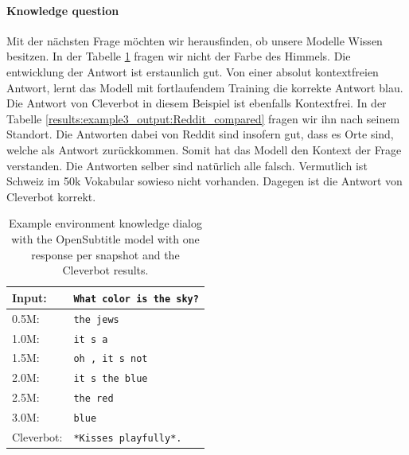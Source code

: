 \paragraph{Knowledge question}Mit der nächsten Frage möchten wir herausfinden, ob unsere Modelle Wissen besitzen. In der Tabelle \ref{results:example3_output:OpenSubtitle_compared} fragen wir nicht der Farbe des Himmels. Die entwicklung der Antwort ist erstaunlich gut. Von einer absolut kontextfreien Antwort, lernt das Modell mit fortlaufendem Training die korrekte Antwort blau. Die Antwort von Cleverbot in diesem Beispiel ist ebenfalls Kontextfrei.
In der Tabelle \ref{results:example3_output:Reddit_compared} fragen wir ihn nach seinem Standort. Die Antworten dabei von Reddit sind insofern gut, dass es Orte sind, welche als Antwort zurückkommen. Somit hat das Modell den Kontext der Frage verstanden. Die Antworten selber sind natürlich alle falsch. Vermutlich ist Schweiz im 50k Vokabular sowieso nicht vorhanden. Dagegen ist die Antwort von Cleverbot korrekt.
\begin{table}[H]
	\centering
	\begin{adjustbox}{max width=\textwidth}
		\begin{tabular}{ll}
			\toprule
			Input: 	& \texttt{What color is the sky?}\\
			\midrule
			0.5M: 	& \texttt{the jews}\\
			1.0M: 	& \texttt{it s a}\\
			1.5M:	& \texttt{oh , it s not}\\
			2.0M:	& \texttt{it s the blue}\\
			2.5M:	& \texttt{the red}\\
			3.0M:	& \texttt{blue}\\
			Cleverbot:&\texttt{*Kisses playfully*.}\\
			\bottomrule
		\end{tabular}
	\end{adjustbox}
	\caption{Example environment knowledge dialog with the OpenSubtitle model with one response per snapshot and the Cleverbot results.}
	\label{results:example3_output:OpenSubtitle_compared}
\end{table}
